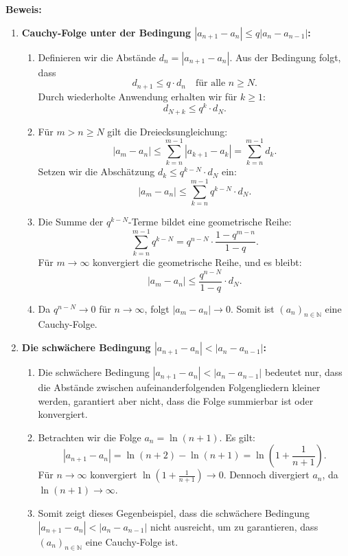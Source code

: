 \documentclass[11pt]{article}
\begin{document}
\textbf{Beweis:}
\begin{enumerate}
    \item \textbf{Cauchy-Folge unter der Bedingung \( |a_{n+1} - a_n| \leq q |a_n - a_{n-1}| \):}
    \begin{enumerate}
        \item Definieren wir die Abstände \( d_n = |a_{n+1} - a_n| \). Aus der Bedingung folgt, dass
        \[
        d_{n+1} \leq q \cdot d_n \quad \text{für alle } n \geq N.
        \]
        Durch wiederholte Anwendung erhalten wir für \( k \geq 1 \):
        \[
        d_{N+k} \leq q^k \cdot d_N.
        \]
        \item Für \( m > n \geq N \) gilt die Dreiecksungleichung:
        \[
        |a_m - a_n| \leq \sum_{k=n}^{m-1} |a_{k+1} - a_k| = \sum_{k=n}^{m-1} d_k.
        \]
        Setzen wir die Abschätzung \( d_k \leq q^{k-N} \cdot d_N \) ein:
        \[
        |a_m - a_n| \leq \sum_{k=n}^{m-1} q^{k-N} \cdot d_N.
        \]
        \item Die Summe der \( q^{k-N} \)-Terme bildet eine geometrische Reihe:
        \[
        \sum_{k=n}^{m-1} q^{k-N} = q^{n-N} \cdot \frac{1 - q^{m-n}}{1-q}.
        \]
        Für \( m \to \infty \) konvergiert die geometrische Reihe, und es bleibt:
        \[
        |a_m - a_n| \leq \frac{q^{n-N}}{1-q} \cdot d_N.
        \]
        \item Da \( q^{n-N} \to 0 \) für \( n \to \infty \), folgt \( |a_m - a_n| \to 0 \). Somit ist \( (a_n)_{n \in \mathbb{N}} \) eine Cauchy-Folge.
    \end{enumerate}

    \item \textbf{Die schwächere Bedingung \( |a_{n+1} - a_n| < |a_n - a_{n-1}| \):}
    \begin{enumerate}
        \item Die schwächere Bedingung \( |a_{n+1} - a_n| < |a_n - a_{n-1}| \) bedeutet nur, dass die Abstände zwischen aufeinanderfolgenden Folgengliedern kleiner werden, garantiert aber nicht, dass die Folge summierbar ist oder konvergiert.
        \item Betrachten wir die Folge \( a_n = \ln(n+1) \). Es gilt:
        \[
        |a_{n+1} - a_n| = \ln(n+2) - \ln(n+1) = \ln\left(1 + \frac{1}{n+1}\right).
        \]
        Für \( n \to \infty \) konvergiert \( \ln\left(1 + \frac{1}{n+1}\right) \to 0 \). Dennoch divergiert \( a_n \), da \( \ln(n+1) \to \infty \).
        \item Somit zeigt dieses Gegenbeispiel, dass die schwächere Bedingung \( |a_{n+1} - a_n| < |a_n - a_{n-1}| \) nicht ausreicht, um zu garantieren, dass \( (a_n)_{n \in \mathbb{N}} \) eine Cauchy-Folge ist.
    \end{enumerate}
\end{enumerate}
\end{document}

